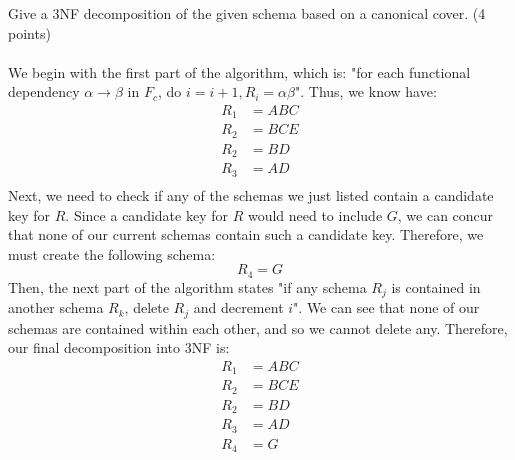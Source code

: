 \documentclass[a4 paper]{article}
\begin{document}


 Give a 3NF decomposition of the given schema based on a canonical cover. \indent (4 points)\\\\
We begin with the first part of the algorithm, which is: "for each functional dependency $\alpha\rightarrow\beta$ in $F_c$, do $i=i+1,R_i=\alpha\beta$". Thus, we know have:
\begin{align*}
  R_1 &= ABC\\
  R_2 &= BCE\\
  R_2 &= BD\\
  R_3 &= AD\\
\end{align*}
Next, we need to check if any of the schemas we just listed contain a candidate key for $R$. Since a candidate key for $R$ would need to include $G$, we can concur that none of our current schemas contain such a candidate key. Therefore, we must create the following schema:
$$R_4=G$$
Then, the next part of the algorithm states "if any schema $R_j$ is contained in another schema $R_k$, delete $R_j$ and decrement $i$". We can see that none of our schemas are contained within each other, and so we cannot delete any. Therefore, our final decomposition into 3NF is:
\begin{align*}
  R_1 &= ABC\\
  R_2 &= BCE\\
  R_2 &= BD\\
  R_3 &= AD\\
  R_4 &= G
\end{align*}
\end{document}
